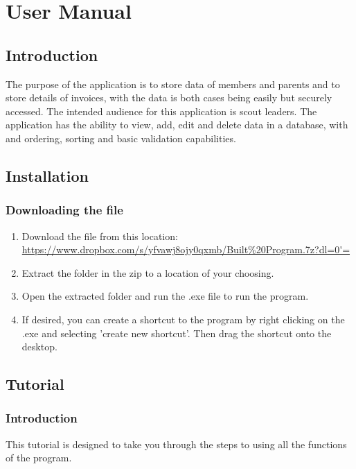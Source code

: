 \chapter{User Manual}


\minitoc

\tableofcontents

\section{Introduction}
The purpose of the application is to store data of members and parents and to store details of invoices, with the data is both cases being easily but securely accessed. The intended audience for this application is scout leaders. The application has the ability to view, add, edit and delete data in a database, with  and ordering, sorting and basic validation capabilities.

\section{Installation}

\subsection{Downloading the file}

\begin{enumerate}
	\item Download the file from this location: \url{https://www.dropbox.com/s/yfvawj8ojy0qxmb/Built\%20Program.7z?dl=0'=}
	\item Extract the folder in the zip to a location of your choosing.
	\item Open the extracted folder and  run the .exe file to run the program.
	\item If desired, you can create a shortcut to the program by right clicking on the .exe and selecting 'create new shortcut'. Then drag the shortcut onto the desktop.
\end{enumerate}

\section{Tutorial}

\subsection{Introduction}
This tutorial is designed to take you through the steps to using all the functions of the program. 

